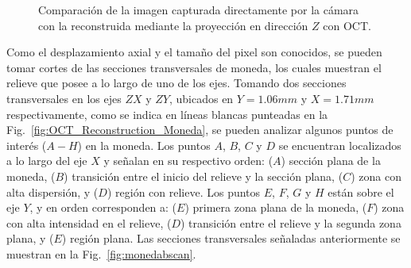 \begin{figure}[h!]
	\centering
	\caption[Comparación de imágenes capturadas con la moneda]{Comparación de la imagen capturada directamente por la cámara con la reconstruida mediante la proyección en dirección $Z$ con OCT.}
	\label{fig:comparacionimgdirecta}
\end{figure}

Como el desplazamiento axial y el tamaño del pixel son conocidos, se pueden tomar cortes de las secciones transversales de moneda, los cuales muestran el relieve que posee a lo largo de uno de los ejes. Tomando dos secciones transversales en los ejes $ZX$ y $ZY$, ubicados en $Y = 1.06mm$ y $X = 1.71mm$ respectivamente, como se indica en líneas blancas punteadas en la Fig.~\ref{fig:OCT_Reconstruction_Moneda}, se pueden analizar algunos puntos de interés ($A-H$) en la moneda. Los puntos $A$, $B$, $C$ y $D$ se encuentran localizados a lo largo del eje $X$ y señalan en su respectivo orden: ($A$) sección plana de la moneda, ($B$) transición entre el inicio del relieve y la sección plana, ($C$) zona con alta dispersión, y ($D$) región con relieve. Los puntos $E$, $F$, $G$ y $H$ están sobre el eje $Y$, y en orden corresponden a: ($E$) primera zona plana de la moneda, ($F$) zona con alta intensidad en el relieve, ($D$) transición entre el relieve y la segunda zona plana, y ($E$) región plana. Las secciones transversales señaladas anteriormente se muestran en la Fig.~\ref{fig:monedabscan}.


